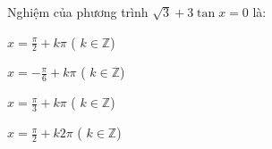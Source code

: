 \begin{question}[type=multiple_choice,difficulty=2,code={I-8}]
Nghiệm của phương trình $ \sqrt{3} + 3 \tan x = 0 $ là:

\begin{choice}[label=A]
$ x = \frac{\pi}{2} + k\pi $ ( $ k \in \mathbb{Z} $)
\end{choice}

\begin{choice}[correct,label=B]
$ x = -\frac{\pi}{6} + k\pi $ ( $ k \in \mathbb{Z} $)
\end{choice}

\begin{choice}[label=C]
$ x = \frac{\pi}{3} + k\pi $ ( $ k \in \mathbb{Z} $)
\end{choice}

\begin{choice}[label=D]
$ x = \frac{\pi}{2} + k2\pi $ ( $ k \in \mathbb{Z} $)
\end{choice}

\end{question}